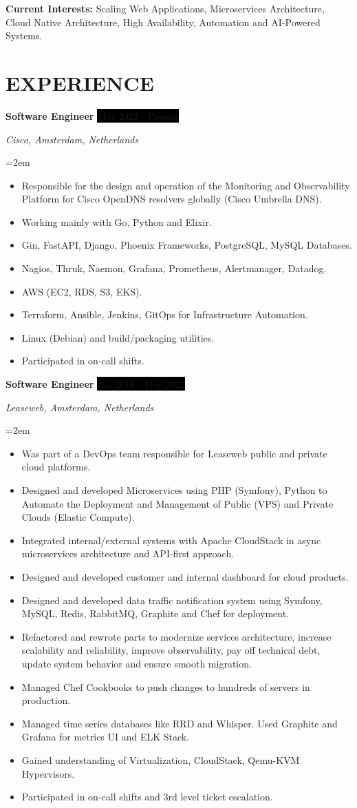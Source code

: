 \documentclass[paper=a4,fontsize=11pt]{scrartcl} %
\newcommand{\sepspace}{\vspace*{1em}}		%
\newcommand{\NewPart}[1]{\section*{\uppercase{#1}}}
\newcommand{\EducationEntry}[4]{
		\noindent \textbf{#1} \hfill      %
		\colorbox{Black}{%
			\parbox{6em}{%
			\hfill\color{White}#2}} \par  %
		\noindent \textit{#3} \par        %
		\noindent\hangindent=2em\hangafter=0 \small #4 %
		\normalsize \par}
\newcommand{\WorkEntry}[4]{				  %
		\noindent \textbf{#1} \hfill      %
		\colorbox{Black}{\color{White}#2} \par  %
		\noindent \textit{#3} \par              %
		\noindent\hangindent=2em\hangafter=0 \small #4 %
		\normalsize \par}
\begin{document}
\sepspace

\textbf{Current Interests:} Scaling Web Applications, Microservices Architecture, Cloud Native Architecture, High Availability, Automation and AI-Powered Systems.

\sepspace


\NewPart{Experience}{}

\WorkEntry{Software Engineer}{May 2022 - Present}{Cisco, Amsterdam, Netherlands}{\begin{itemize}
\item Responsible for the design and operation of the Monitoring and Observability Platform for Cisco OpenDNS resolvers globally (Cisco Umbrella DNS).
\item Working mainly with Go, Python and Elixir.
\item Gin, FastAPI, Django, Phoenix Frameworks, PostgreSQL, MySQL Databases.
\item Nagios, Thruk, Naemon, Grafana, Prometheus, Alertmanager, Datadog.
\item AWS (EC2, RDS, S3, EKS).
\item Terraform, Ansible, Jenkins, GitOps for Infrastructure Automation.
\item Linux (Debian) and build/packaging utilities.
\item Participated in on-call shifts.
\end{itemize}}
\sepspace

\WorkEntry{Software Engineer}{Jan 2018 - May 2022}{Leaseweb, Amsterdam, Netherlands}{\begin{itemize}
\item Was part of a DevOps team responsible for Leaseweb public and private cloud platforms.
\item Designed and developed Microservices using PHP (Symfony), Python to Automate the Deployment and Management of Public (VPS) and Private Clouds (Elastic Compute).
\item Integrated internal/external systems with Apache CloudStack in async microservices architecture and API-first approach.
\item Designed and developed customer and internal dashboard for cloud products.
\item Designed and developed data traffic notification system using Symfony, MySQL, Redis, RabbitMQ, Graphite and Chef for deployment.
\item Refactored and rewrote parts to modernize services architecture, increase scalability and reliability, improve observability, pay off technical debt, update system behavior and ensure smooth migration.
\item Managed Chef Cookbooks to push changes to hundreds of servers in production.
\item Managed time series databases like RRD and Whisper. Used Graphite and Grafana for metrics UI and ELK Stack.
\item Gained understanding of Virtualization, CloudStack, Qemu-KVM Hypervisors.
\item Participated in on-call shifts and 3rd level ticket escalation.
\end{itemize}}
\sepspace
\end{document}
